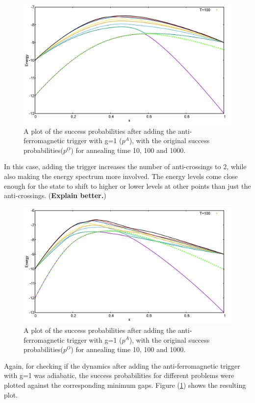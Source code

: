 \documentclass[../main.tex]{subfiles}
\begin{document}
\begin{figure}[H]
\centering 
\includegraphics[scale=0.3]{969_O_T100.png}
\caption{A plot of the success probabilities after adding the anti-ferromagnetic trigger with g=1 ($p^A$), with the original success probabilities($p^O$) for annealing time 10, 100 and 1000.}
\label{fig:a30}
\end{figure}
In this case, adding the trigger increases the number of anti-crossings to 2, while also making the energy spectrum more involved. The energy levels come close enough for the state to shift to higher or lower levels at other points than just the anti-crossings. (\textbf{Explain better.})
\begin{figure}[H]
\centering 
\includegraphics[scale=0.3]{969_A_T100_g1.png}
\caption{A plot of the success probabilities after adding the anti-ferromagnetic trigger with g=1 ($p^A$), with the original success probabilities($p^O$) for annealing time 10, 100 and 1000.}
\label{fig:a31}
\end{figure}

Again, for checking if the dynamics after adding the anti-ferromagnetic trigger with g=1 was adiabatic, the success probabilities for different problems were plotted against the corresponding minimum gaps. Figure (\ref{fig:a30}) shows the resulting plot.
\end{document}
